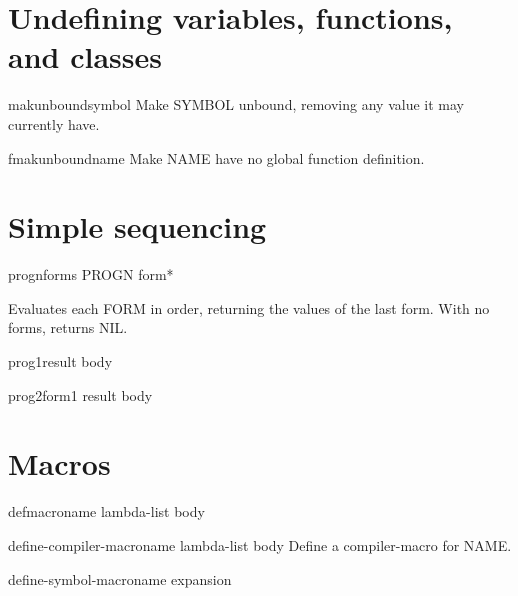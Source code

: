 \documentclass[10pt,english]{book}
\begin{document}
\section{Undefining variables, functions, and classes}
\label{sec:undef-vari-funct}

\begin{function}{makunbound}{symbol}
  Make SYMBOL unbound, removing any value it may currently have.
\end{function}

\begin{function}{fmakunbound}{name}
  Make NAME have no global function definition.
\end{function}

\section{Simple sequencing}
\label{sec:simple-sequencing}

\begin{specialop}{progn}{\rest forms}
  PROGN form*

Evaluates each FORM in order, returning the values of the last form. With no
forms, returns NIL.
\end{specialop}

\begin{macro}{prog1}{result \body body}
  
\end{macro}

\begin{macro}{prog2}{form1 result \body body}
  
\end{macro}

\section{Macros}
\label{sec:macros-1}

\begin{macro}{defmacro}{name lambda-list \rest body}
  
\end{macro}

\begin{macro}{define-compiler-macro}{name lambda-list \body body}
  Define a compiler-macro for NAME.
\end{macro}

\begin{macro}{define-symbol-macro}{name expansion}
  
\end{macro}
\end{document}
